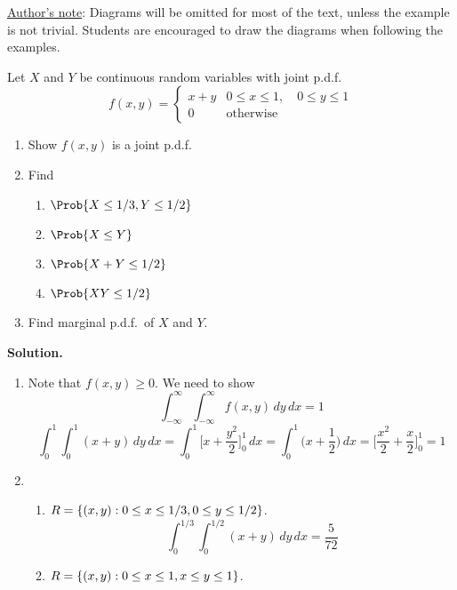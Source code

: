 \underline{Author's note}: Diagrams will be omitted for most of the text,
unless the example is not trivial. Students are encouraged
to draw the diagrams when following the examples.
\begin{Example}{}{}
    Let $ X $ and $ Y $ be continuous random variables
    with joint p.d.f.\
    \[ f(x,y)=
        \begin{cases}
            x+y & 0\le x\le 1,\quad 0\le y\le 1 \\
            0   & \text{otherwise}
        \end{cases} \]
    \begin{enumerate}[label=(\roman*)]
        \item Show $ f(x,y) $ is a joint p.d.f.\
        \item Find
              \begin{enumerate}[label=(\alph*)]
                  \item $ \Prob{X\le 1/3, Y\le 1/2} $
                  \item $ \Prob{X\le Y} $
                  \item $ \Prob{X+Y\le 1/2} $
                  \item $ \Prob{XY\le 1/2} $
              \end{enumerate}
        \item Find marginal p.d.f.\ of $ X $ and $ Y $.
    \end{enumerate}
    \textbf{Solution.}
    \begin{enumerate}[label=(\roman*)]
        \item Note that $ f(x,y)\ge 0 $. We need to show
              \[ \int_{-\infty}^{\infty} \int_{-\infty}^{\infty} f(x,y)\, d{y} \, d{x} =1 \]
              \[ \int_{0}^{1} \int_{0}^{1} (x+y)\, d{y} \, d{x}
                  =\int_{0}^{1} \biggl[ x+\frac{y^2}{2} \biggr]_0^1\, d{x}
                  =\int_{0}^{1} \biggl( x+\frac{1}{2} \biggr)\, d{x}
                  =\biggl[ \frac{x^2}{2}  +\frac{x}{2}\biggr]_0^1
                  =1
              \]
        \item \begin{enumerate}[label=(\alph*)]
                  \item $ R=\{(x,y):0\le x\le 1/3, 0\le y
                                \le 1/2\} $.
                        \[ \int_{0}^{1/3} \int_{0}^{1/2} (x+y)\, d{y} \, d{x} =\frac{5}{72} \]
                  \item $ R=\{(x,y):0\le x\le 1,x\le y\le 1\} $.
                        \[
\]
\end{enumerate}
\end{enumerate}
\end{Example}
